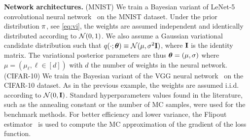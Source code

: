 \documentclass[tablecaption=bottom,wcp]{jmlr}
\begin{document}
\vspace{0.08in}
\noindent \textbf{Network architectures.} \hspace{0.1in}
(MNIST) We train a Bayesian variant of LeNet-5 convolutional neural network~\citep{lecun1998gradient} on the MNIST dataset. 
Under the prior distribution $\prior$, see \eqref{eq:vi}, the weights are assumed independent and identically distributed according to ${\cal N}(0,1)$.
We also assume a Gaussian variational candidate distribution such that $q(\cdot; \param) \equiv  \mathcal{N}(\mu,\sigma^2 \Id )$, where $\Id$ is the identity matrix.
The variational posterior parameters are thus $\param = (\mu, \sigma) $ where $\mu = (\mu_\ell, \ell \in [d])$ with $d$ the number of weights in the neural network. 
(CIFAR-10) We train the Bayesian variant of the VGG neural network~\citep{simonyan2014very} on the CIFAR-10 dataset.
As in the previous example, the weights are assumed i.i.d. according to ${\cal N}(0,\Id)$.
Standard hyperparameters values found in the literature, such as the annealing constant or the number of MC samples, were used for the benchmark methods. 
For better efficiency and lower variance, the Flipout estimator~\citep{wen2018flipout} is used to compute the MC approximation of the gradient of the loss function.
\end{document}
